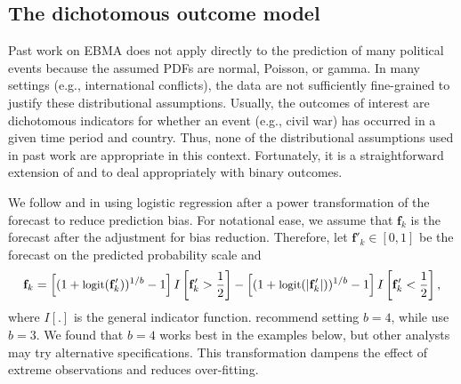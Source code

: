 \subsection{The dichotomous outcome model}

Past work on EBMA does not apply directly to the prediction of many
political events because the assumed PDFs are normal, Poisson, or
gamma. In many settings (e.g., international conflicts), the data are
not sufficiently fine-grained to justify these distributional
assumptions.  Usually, the outcomes of interest are dichotomous
indicators for whether an event (e.g., civil war) has occurred in a
given time period and country. Thus, none of the distributional
assumptions used in past work are appropriate in this context.
Fortunately, it is a straightforward extension of
\citet{Sloughter:2007} and \citet{Sloughter:2010} to deal
appropriately with binary outcomes.

We follow \citet{Sloughter:2007} and \citet{Hamill:2004} in using
logistic regression after a power transformation of the forecast to
reduce prediction bias. For notational ease, we assume that $\mathbf{f}_k$ is the
forecast after the adjustment for bias reduction.  Therefore, let
$\mathbf{f}'_k \in [0,1]$ be the forecast on the predicted probability scale
 and
\begin{equation}
\small
\mathbf{f}_k =  \left[(1+\mbox{logit}(\mathbf{f}'_k))^{1/b} - 1\right]I\left[\mathbf{f}'_k>\frac{1}{2}\right]  - \left[(1+\mbox{logit}(|\mathbf{f}'_k|))^{1/b} -  1\right]I\left[\mathbf{f}'_k<\frac{1}{2}\right],
 \end{equation}
 \noindent where $I[.]$ is the general indicator function.
 \citet{Hamill:2004} recommend setting $b=4$, while
 \citet{Sloughter:2007} use $b=3$.  We found that $b=4$ works best in
 the examples below, but other analysts may try alternative
 specifications. This transformation dampens the effect of
   extreme observations and reduces over-fitting.

